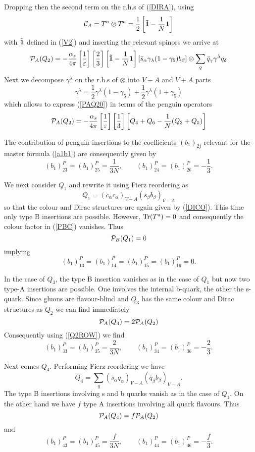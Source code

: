 \documentclass[12pt]{article}
\def\as{\alpha_s}
\newcommand{\be}{\begin{equation}}
\newcommand{\ee}{\end{equation}}
\begin{document}
\begin{itemize}
\begin{itemize}
Dropping then the second term on the r.h.s of (\ref{DIRA}), using
\be
{\cal C}_A=T^a\otimes T^a =\frac{1}{2}
\left[{\bf \tilde 1}-\frac{1}{N} {\bf 1}\right]
\ee
with ${\bf \tilde 1}$ defined in (\ref{V2}) and inserting 
the relevant spinors
we arrive at
\be\label{PAQ20}
{\cal P}_A(Q_2)=-\frac{\as}{4\pi} 
\left[\frac{1}{\varepsilon}\right]\left[\frac{2}{3}\right]
\left[{\bf \tilde 1}-\frac{1}{N} {\bf 1}\right]
[\bar s_\alpha \gamma_\lambda (1-\gamma_5) b_\beta]\otimes
\sum_q \bar q_\gamma \gamma^\lambda q_\delta
\ee
Next we decompose $\gamma^\lambda$ on the r.h.s of $\otimes$
into $V-A$ and $V+A$ parts
\be
\gamma^\lambda=\frac{1}{2}\gamma^\lambda(1-\gamma_5)+
\frac{1}{2}\gamma^\lambda(1+\gamma_5)
\ee 
which allows to express (\ref{PAQ20}) in terms of the penguin
operators 
\be\label{PAQ2}
{\cal P}_A(Q_2)=-\frac{\as}{4\pi} 
\left[\frac{1}{\varepsilon}\right]\left[\frac{1}{3}\right]
\left[Q_4+Q_6-\frac{1}{N} (Q_3+Q_5)\right]
\ee

The contribution of penguin insertions to the coefficients $(b_1)_{2j}$ 
relevant for the master formula (\ref{a1b1})
are consequently given by
\be\label{Q2ROW}
(b_1)_{23}^P=(b_1)_{25}^P=\frac{1}{3N}, \quad\quad
(b_1)_{24}^P=(b_1)_{26}^P=-\frac{1}{3}.
\ee

We next consider $Q_1$ and rewrite it using Fierz reordering
as
\be
Q_1=(\bar c_\alpha c_\alpha)_{V-A} (\bar s_\beta b_\beta)_{V-A}
\ee
so that the colour and Dirac structures are again given by
(\ref{DICO}). This time only type B insertions are possible.
However, ${\rm Tr}(T^a)=0$ and consequently the colour factor in
(\ref{PBC}) vanishes. Thus
\be\label{PBQ1}
{\cal P}_B(Q_1)=0
\ee
implying
\be\label{Q1ROW}
(b_1)_{13}^P=(b_1)_{14}^P=
(b_1)_{15}^P=(b_1)_{16}^P=0.
\ee

In the case of $Q_3$, the type B insertion vanishes as in the case of
$Q_1$ but now two type-A insertions are possible. One involves the
internal b-quark, the other the s-quark. 
Since gluons are flavour-blind and $Q_3$ has the same colour and 
Dirac structures as $Q_2$ we can find immediately 
\be\label{PAQ3}
{\cal P}_A(Q_3)= 2 {\cal P}_A(Q_2)
\ee
Consequently using (\ref{Q2ROW}) we find
\be\label{Q3ROW}
(b_1)_{33}^P=(b_1)_{35}^P=\frac{2}{3N}, \quad\quad
(b_1)_{34}^P=(b_1)_{36}^P=-\frac{2}{3}.
\ee

Next comes $Q_4$. Performing Fierz reordering
we have
\be
Q_4=\sum_q(\bar s_\alpha q_\alpha)_{V-A} (\bar q_\beta b_\beta)_{V-A}.
\ee
The type B insertions involving s and b quarks vanish as in 
the case of $Q_1$. On the other hand we have $f$ type A insertions
involving all quark flavours. Thus
\be\label{PAQ4}
{\cal P}_A(Q_4)=f {\cal P}_A(Q_2) 
\ee
and
\be\label{Q4ROW}
(b_1)_{43}^P=(b_1)_{45}^P=\frac{f}{3N}, \quad\quad
(b_1)_{44}^P=(b_1)_{46}^P=-\frac{f}{3}.
\ee


\end{itemize}
\end{itemize}
\end{document}
